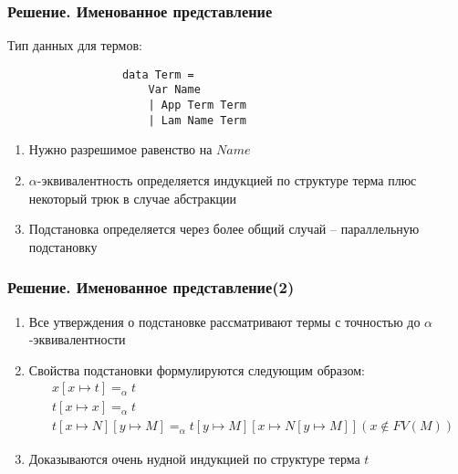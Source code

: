 \documentclass{beamer}
\newcommand{\alphaeq}{=_{\alpha}}
\begin{document}
\begin{frame}[fragile=singleslide]\frametitle{Решение. Именованное представление}
    Тип данных для термов:
        \begin{figure}[H]
            \center
            \begin{verbatim}
            data Term =
                Var Name
                | App Term Term
                | Lam Name Term
            \end{verbatim}
        \end{figure}
    \begin{enumerate}
        \item Нужно разрешимое равенство на $Name$
        \item $\alpha$-эквивалентность определяется индукцией по структуре терма плюс некоторый трюк в случае абстракции
        \item Подстановка определяется через более общий случай -- параллельную подстановку
    \end{enumerate}
\end{frame}


\begin{frame}[fragile=singleslide]\frametitle{Решение. Именованное представление(2)}
    \begin{enumerate}
        \item Все утверждения о подстановке рассматривают термы с точностью до $\alpha$-эквивалентности
        \item Свойства подстановки формулируются следующим образом:
            \begin{align*}
                &x[x \mapsto t] \alphaeq t\\
                &t[x \mapsto x] \alphaeq t\\
                &t[x \mapsto N][y \mapsto M] \alphaeq t[y \mapsto M][x \mapsto N[y \mapsto M]] (x \notin FV(M))
            \end{align*}
        \item Доказываются очень нудной индукцией по структуре терма $t$
    \end{enumerate}
\end{frame}
\end{document}
